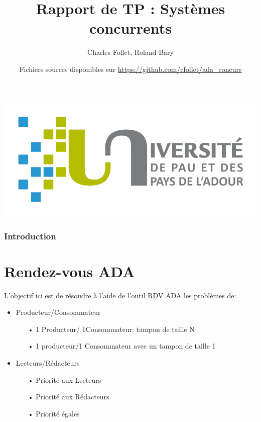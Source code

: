 \documentclass[11pt,a4paper]{article}
\title{\textbf{Rapport de TP : Systèmes concurrents}}
\author{Charles Follet, Roland Bary}
\date{Fichiers sources disponibles sur \url{https://github.com/cfollet/ada_concurr}}
\begin{document}
\maketitle
\begin{center}
    \begin{center}
        \includegraphics[scale=0.3]{logoUppa.png}
    \end{center}
\end{center}
\thispagestyle{empty}
\newpage
\pagestyle{fancy}
\renewcommand{\contentsname}{Sommaire}
\tableofcontents
\newpage
\section*{Introduction}
\part{Rendez-vous ADA}
L'objectif ici est de résoudre à l'aide de l'outil RDV ADA les problèmes de:
\begin{itemize}
    \item Producteur/Consommateur
          \begin{itemize}
            \item[•]1 Producteur/ 1Consommateur: tampon de taille N
            \item[•]1 producteur/1 Consommateur avec un tampon de taille 1
          \end{itemize}
    \item Lecteurs/Rédacteurs
          \begin{itemize}
            \item[•] Priorité aux Lecteurs
            \item[•] Priorité aux Rédacteurs
            \item[•] Priorité égales
          \end{itemize}
\end{itemize}
\end{document}
